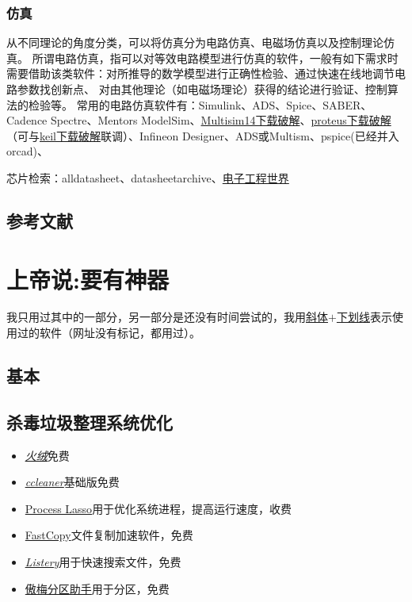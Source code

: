 \documentclass[UTF8,oneside]{ctexbook}
\begin{document}
\subsection{仿真}
从不同理论的角度分类，可以将仿真分为电路仿真、电磁场仿真以及控制理论仿真。
所谓电路仿真，指可以对等效电路模型进行仿真的软件，一般有如下需求时需要借助该类软件：对所推导的数学模型进行正确性检验、通过快速在线地调节电路参数找创新点、
对由其他理论（如电磁场理论）获得的结论进行验证、控制算法的检验等。
常用的电路仿真软件有：Simulink、ADS、Spice、SABER、Cadence Spectre、Mentors ModelSim、\href{https://mp.weixin.qq.com/s/4AQa8VciAgzS1NZvd5tM_A}{Multisim14下载破解}、\href{https://mp.weixin.qq.com/s/qb0gipvdphj0YG8iP3IyhQ}{proteus下载破解}（可与\href{https://mp.weixin.qq.com/s/NzK8HAKlY_tXBZy8lQtfsQ}{keil下载破解}联调）、Infineon Designer、ADS或Multism、pspice(已经并入orcad)、

芯片检索：alldatasheet、datasheetarchive、\href{http:\\datasheet.eeworld.com.cn}{电子工程世界}


\section{参考文献}


\chapter{上帝说:要有神器}
我只用过其中的一部分，另一部分是还没有时间尝试的，我用\underline{斜体$+$下划线}表示使用过的软件（网址没有标记，都用过）。

\section{基本}
\section{杀毒垃圾整理系统优化}
\begin{itemize}
	\item \underline{\textit{\href{https://www.huorong.cn}{火绒}}}\quad 免费
	\item \underline{\textit{\href{http://ccleaner.soft88.com}{ccleaner}}}\quad 基础版免费
	\item \href{https://bitsum.com}{Process Lasso}\quad 用于优化系统进程，提高运行速度，收费
	\item \href{https://fastcopy.jp/en/}{FastCopy}\quad 文件复制加速软件，免费
	\item \underline{\textit{\href{https://www.listary.com}{Listery}}}\quad 用于快速搜索文件，免费
	\item \href{http://www.disktool.cn/download.html}{傲梅分区助手}\quad 用于分区，免费
\end{itemize}
\end{document}
